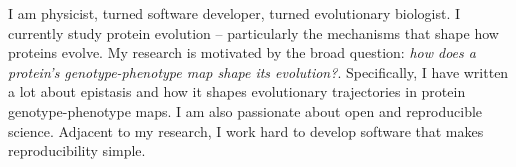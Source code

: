 

\begin{cvparagraph}


I am physicist, turned software developer, turned evolutionary biologist. I currently study protein evolution -- particularly the mechanisms that shape how proteins evolve. My research is motivated by the broad question: \textit{how does a protein's genotype-phenotype map shape its evolution?}. Specifically, I have written a lot about epistasis and how it shapes evolutionary trajectories in protein genotype-phenotype maps. I am also passionate about open and reproducible science. Adjacent to my research, I work hard to develop software that makes reproducibility simple. 

\end{cvparagraph}
